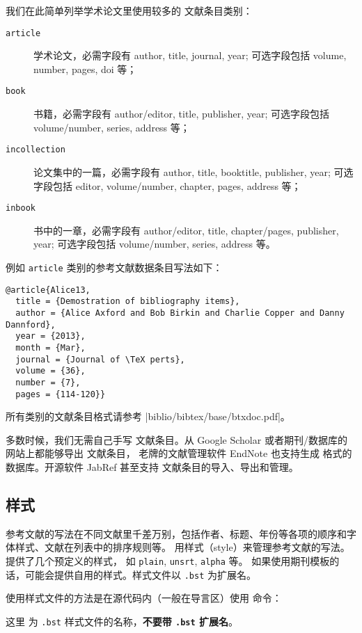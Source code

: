 我们在此简单列举学术论文里使用较多的  文献条目类别：
\begin{description}
  \item[\texttt{article}] 学术论文，必需字段有 author, title, journal, year; 可选字段包括 volume, number, pages, doi 等；
  \item[\texttt{book}] 书籍，必需字段有 author/editor, title, publisher, year; 可选字段包括 volume/number, series, address 等；
  \item[\texttt{incollection}] 论文集中的一篇，必需字段有 author, title, booktitle, publisher, year; 可选字段包括 editor, volume/number, chapter, pages, address 等；
  \item[\texttt{inbook}] 书中的一章，必需字段有 author/editor, title, chapter/pages, publisher, year; 可选字段包括 volume/number, series, address 等。
\end{description}

例如 \texttt{article} 类别的参考文献数据条目写法如下：
\begin{verbatim}
@article{Alice13,
  title = {Demostration of bibliography items},
  author = {Alice Axford and Bob Birkin and Charlie Copper and Danny Dannford},
  year = {2013},
  month = {Mar},
  journal = {Journal of \TeX perts},
  volume = {36},
  number = {7},
  pages = {114-120}}
\end{verbatim}
所有类别的文献条目格式请参考 \CTAN|biblio/bibtex/base/btxdoc.pdf|。

多数时候，我们无需自己手写  文献条目。从 Google Scholar 或者期刊/数据库的网站上都能够导出  文献条目，
老牌的文献管理软件 EndNote 也支持生成  格式的数据库。开源软件 JabRef 甚至支持  文献条目的导入、导出和管理。

\subsection{ 样式}\label{subsec:bibtex-style}

参考文献的写法在不同文献里千差万别，包括作者、标题、年份等各项的顺序和字体样式、文献在列表中的排序规则等。
 用样式（style）来管理参考文献的写法。 提供了几个预定义的样式，
如 \texttt{plain}, \texttt{unsrt}, \texttt{alpha} 等。
如果使用期刊模板的话，可能会提供自用的样式。样式文件以 \texttt{.bst} 为扩展名。

使用样式文件的方法是在源代码内（一般在导言区）使用  命令：
\begin{command}
\end{command}
这里  为 \texttt{.bst} 样式文件的名称，\textbf{不要带 \texttt{.bst} 扩展名}。

